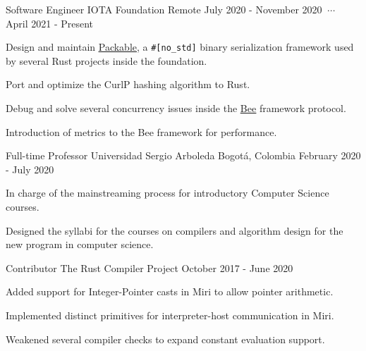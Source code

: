 


\begin{cventries}

    \cventry
    {Software Engineer}
    {IOTA Foundation}
    {Remote}
    {July 2020 - November 2020 $\ \cdots\ $ April 2021 - Present}
    {
        \begin{cvitems}
        \item Design and maintain \href{https://crates.io/crates/packable}{\underline{Packable}}, a \texttt{\#[no\_std]} binary serialization framework used by several Rust projects inside the foundation.
        \item Port and optimize the CurlP hashing algorithm to Rust.
        \item Debug and solve several concurrency issues inside the \href{https://github.com/iotaledger/bee/}{\underline{Bee}} framework protocol.
        \item Introduction of metrics to the Bee framework for performance.
        \end{cvitems}
    }

    \cventry
    {Full-time Professor}
    {Universidad Sergio Arboleda}
    {Bogotá, Colombia}
    {February 2020 - July 2020}
    {
        \begin{cvitems}
        \item In charge of the mainstreaming process for introductory Computer Science courses.
        \item Designed the syllabi for the courses on compilers and algorithm design for the new program in computer science.
        \end{cvitems}
    }

    \cventry
    {Contributor}
    {The Rust Compiler Project}
    {}
    {October 2017 - June 2020}
    {
        \begin{cvitems}
        \item Added support for Integer-Pointer casts in Miri to allow pointer arithmetic.
        \item Implemented distinct primitives for interpreter-host communication in Miri.
        \item Weakened several compiler checks to expand constant evaluation support.
        \end{cvitems}
    }


\end{cventries}
